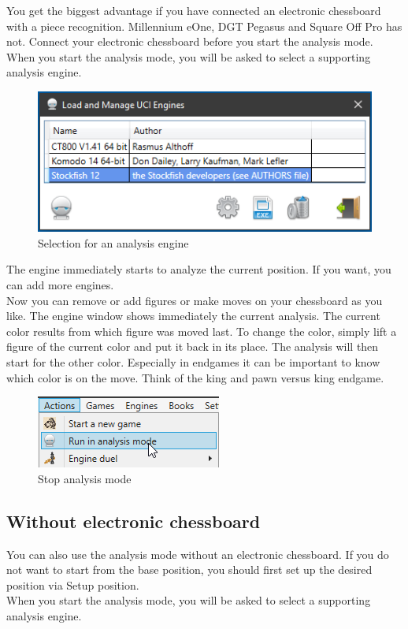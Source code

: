 \documentclass[11pt,a4paper]{article}
\begin{document}
You get the biggest advantage if you have connected an electronic chessboard with a piece recognition. Millennium eOne, DGT Pegasus and Square Off Pro has not. Connect your electronic chessboard before you start the analysis mode.\\ 
When you start the analysis mode, you will be asked to select a supporting analysis engine.

\begin{figure}[H]
	\centering
	\includegraphics[scale=0.9]{AnalyzeMode2.png}
	\caption{Selection for an analysis engine}
	\label{fig:AnalyzeMode2}
\end{figure}

The engine immediately starts to analyze the current position. If you want, you can add more engines.\\
Now you can remove or add figures or make moves on your chessboard as you like. The engine window shows immediately the current analysis. The current color results from which figure was moved last. To change the color, simply lift a figure of the current color and put it back in its place. The analysis will then start for the other color. Especially in endgames it can be important to know which color is on the move. Think of the king and pawn versus king endgame.

\begin{figure}[H]
	\centering
	\includegraphics[scale=1.0]{AnalyzeMode3.png}
	\caption{Stop analysis mode}
	\label{fig:AnalyzeMode3}
\end{figure}

\subsection{Without electronic chessboard}
You can also use the analysis mode without an electronic chessboard. If you do not want to start from the base position, you should first set up the desired position via Setup position.\\
When you start the analysis mode, you will be asked to select a supporting analysis engine.
\end{document}
